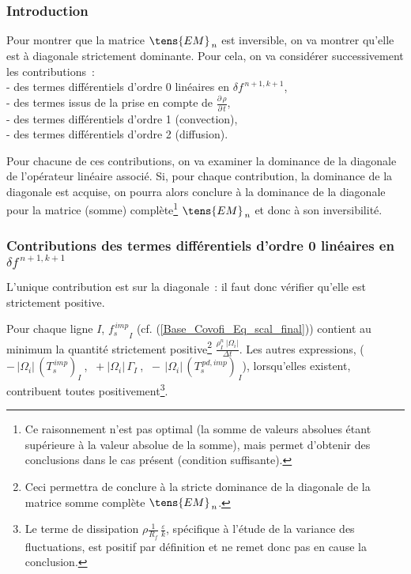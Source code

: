 \subsubsection*{Introduction}
Pour montrer que la matrice $\tens{EM}_{\,n}$ est inversible, on va
montrer qu'elle est à diagonale strictement dominante. Pour cela, on
va considérer successivement les contributions~:\\
\hspace*{1cm}- des termes différentiels
d'ordre 0 linéaires en $\delta f^{\,n+1,k+1}$,\\
\hspace*{1cm}- des termes issus de la prise en compte de
$\displaystyle \frac {{\partial}\,\rho}{{\partial}\,t}$,\\
\hspace*{1cm}- des termes différentiels d'ordre 1 (convection),\\
\hspace*{1cm}- des termes différentiels d'ordre 2 (diffusion).

Pour chacune de ces contributions, on va examiner la
dominance de la diagonale de l'opérateur linéaire associé.
Si, pour chaque contribution, la dominance de la diagonale est acquise, on pourra
alors conclure à la dominance de la diagonale pour la matrice (somme)
complète\footnote{Ce raisonnement n'est pas optimal (la somme de valeurs
absolues étant supérieure à la valeur absolue de la somme), mais permet
d'obtenir des conclusions dans le cas présent (condition
suffisante).}
$\tens{EM}_{\,n}$ et donc à son inversibilité.


\subsubsection*{Contributions des termes différentiels d'ordre 0 linéaires en
$\delta f^{\,n+1,k+1}$}
\label{Base_Covofi_ContributionTermesdOrdre0}
L'unique contribution est sur la diagonale~: il faut donc vérifier qu'elle
est strictement positive.

Pour chaque ligne $I$,  ${f_s^{\,imp}}_I $
 (cf. (\ref{Base_Covofi_Eq_scal_final})) contient au minimum la quantité strictement
positive\footnote{Ceci permettra de conclure à la stricte dominance de la
diagonale de la matrice somme complète $\tens{EM}_{\,n}$.}
 $\displaystyle \frac {\rho_I^n\ |\Omega_i|}{\Delta t}$.
Les autres expressions,
($-\,|\Omega_i|\,(T_s^{\,imp})_I\ $, $\ +|\Omega_i|\, \Gamma_I\ $, $\
-\,|\Omega_i|\,{(T_s^{\,pd,imp})}_{\,I}$),
lorsqu'elles existent, contribuent toutes positivement\footnote{Le terme de
dissipation $\rho\frac{1}{R_f}\,\frac{\varepsilon}{k}$, spécifique à l'étude de la
variance des fluctuations, est positif par définition et ne remet donc pas en cause la
conclusion.}.

